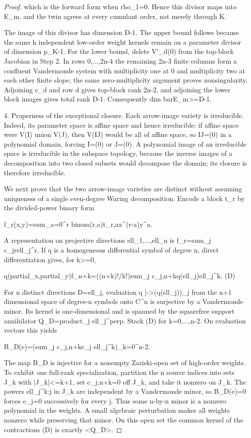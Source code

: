 \documentclass{article}
\begin{document}
\begin{proof}
which is the forward form when rho_1=0. Hence this divisor maps into E_m, and the twin agrees at every cumulant order, not merely through K.

The image of this divisor has dimension D-1. The upper bound follows because the same h independent low-order weight kernels remain on a parameter divisor of dimension p_K-1. For the lower bound, delete V'_d(0) from the top-block Jacobian in Step 2. In rows 0,...,2n-4 the remaining 2n-3 finite columns form a confluent Vandermonde system with multiplicity one at 0 and multiplicity two at each other finite slope; the same zero-multiplicity argument proves nonsingularity. Adjoining e_d and row d gives top-block rank 2n-2, and adjoining the lower block images gives total rank D-1. Consequently dim barE_m>=D-1.

4. Properness of the exceptional closure. Each arrow-image variety is irreducible. Indeed, its parameter space is affine space and hence irreducible: if affine space were V(I) union V(J), then V(IJ) would be all of affine space, so IJ=(0) in a polynomial domain, forcing I=(0) or J=(0). A polynomial image of an irreducible space is irreducible in the subspace topology, because the inverse images of a decomposition into two closed subsets would decompose the domain; its closure is therefore irreducible.

We next prove that the two arrow-image varieties are distinct without assuming uniqueness of a single even-degree Waring decomposition. Encode a block t_r by the divided-power binary form

f_r(x,y)=sum_{a=0}^r binom(r,a)t_{r,a}x^(r-a)y^a.

A representation on projective directions ell_1,...,ell_n is f_r=sum_j c_{jr}ell_j^r. If q is a homogeneous differential symbol of degree n, direct differentiation gives, for k>=0,

q(partial_x,partial_y)f_{n+k}=((n+k)!/k!)sum_j c_{j,n+k}q(ell_j)ell_j^k.          (D)

For n distinct directions D={ell_j}, evaluation q |->(q(ell_j))_j from the n+1 dimensional space of degree-n symbols onto C^n is surjective by a Vandermonde minor. Its kernel is one-dimensional and is spanned by the squarefree support annihilator Q_D=product_j ell_j^perp. Stack (D) for k=0,...,n-2. On evaluation vectors this yields

B_D(e)=(sum_j c_{j,n+k}e_j ell_j^k)_{k=0}^{n-2}.

The map B_D is injective for a nonempty Zariski-open set of high-order weights. To exhibit one full-rank specialization, partition the n source indices into sets J_k with |J_k|<=k+1, set c_{j,n+k}=0 off J_k, and take it nonzero on J_k. The powers {ell_j^k:j in J_k} are independent by a Vandermonde minor, so B_D(e)=0 forces e_j=0 successively for every j. Thus some n-by-n minor is a nonzero polynomial in the weights. A small algebraic perturbation makes all weights nonzero while preserving that minor. On this open set the common kernel of the contractions (D) is exactly <Q_D>.


\end{proof}
\end{document}
